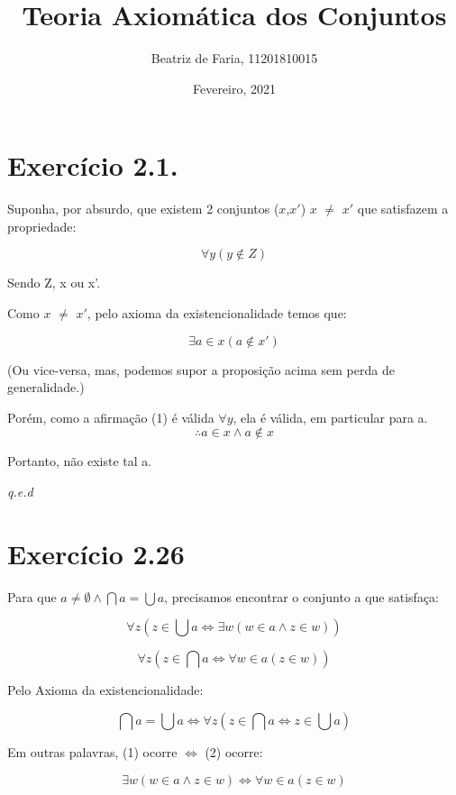 \documentclass[12pt]{extarticle}
\title{Teoria Axiomática dos Conjuntos}
\author{Beatriz de Faria, 11201810015}
\date{Fevereiro, 2021}
\newcommand{\fim}{\begin{flushright}

   \emph{q.e.d}
\end{flushright}}
\begin{document}
\maketitle

\section{Exercício 2.1.}

Suponha, por absurdo, que existem 2 conjuntos ($x$,$x'$) $x$ $\neq$ $x'$ que satisfazem a propriedade:

\begin{equation}
   \forall y (y \notin Z)
\end{equation}

Sendo Z, x ou x'.

Como $x$ $\neq$ $x'$, pelo axioma da existencionalidade temos que:

$$\exists a \in x (a \notin x')$$

(Ou vice-versa, mas, podemos supor a proposição acima sem perda de generalidade.)

Porém, como a afirmação (1) é válida $\forall y$, ela é válida, em particular para a.
$$\therefore a \in x \land a \notin x$$

Portanto, não existe tal a.

\fim

\section{Exercício 2.26}

Para que $a \neq \emptyset \land \bigcap a = \bigcup a$, precisamos encontrar o conjunto a que satisfaça:

\begin{equation}
    \forall z (z \in \bigcup a \Leftrightarrow \exists w (w \in a \land z \in w))
\end{equation}

\begin{equation}
    \forall z (z \in \bigcap a \Leftrightarrow \forall w \in a (z \in w))
\end{equation}

Pelo Axioma da existencionalidade:

$$
\bigcap a = \bigcup a \Leftrightarrow \forall z (z \in \bigcap a \Leftrightarrow z \in \bigcup a)
$$

Em outras palavras, (1) ocorre $\Leftrightarrow$ (2) ocorre:

$$
\exists w (w \in a \land z \in w) \Leftrightarrow \forall w \in a (z \in w)
$$
\end{document}
